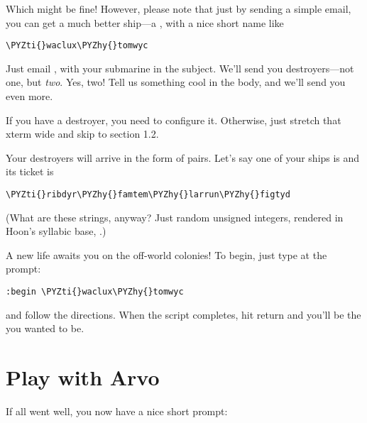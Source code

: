 Which might be fine!  However, please note that just by sending a
simple email, you can get a much better ship---a ,
with a nice short name like

\begin{framed_shaded}
\begin{Verbatim}[fontsize=\relsize{-2.5},fontseries=b,commandchars=\\\{\}]
\PYZti{}waclux\PYZhy{}tomwyc
\end{Verbatim}
\end{framed_shaded}
Just email , with your submarine in the subject.
We'll send you destroyers---not one, but \emph{two}.  Yes, two!  Tell
us something cool in the body, and we'll send you even more.

If you have a destroyer, you need to configure it.  Otherwise,
just stretch that xterm wide and skip to section 1.2.

Your destroyers will arrive in the form of  pairs.
Let's say one of your ships is  and its ticket is

\begin{framed_shaded}
\begin{Verbatim}[fontsize=\relsize{-2.5},fontseries=b,commandchars=\\\{\}]
\PYZti{}ribdyr\PYZhy{}famtem\PYZhy{}larrun\PYZhy{}figtyd
\end{Verbatim}
\end{framed_shaded}
(What are these strings, anyway?  Just random unsigned integers,
rendered in Hoon's syllabic base, .)

A new life awaits you on the off-world colonies!  To begin, just
type at the prompt:

\begin{framed_shaded}
\begin{Verbatim}[fontsize=\relsize{-2.5},fontseries=b,commandchars=\\\{\}]
:begin \PYZti{}waclux\PYZhy{}tomwyc
\end{Verbatim}
\end{framed_shaded}
and follow the directions.  When the script completes, hit return
and you'll be the  you wanted to be.

\section{Play with Arvo}

If all went well, you now have a nice short prompt:


